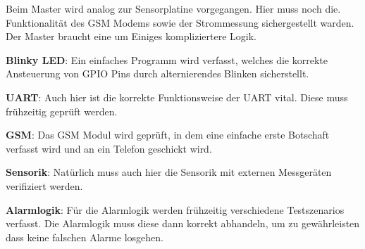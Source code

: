 Beim Master  wird analog  zur Sensorplatine  vorgegangen. Hier muss  noch die.
Funktionalit\"at des GSM Modems  sowie der Strommessung sichergestellt warden.
Der Master braucht eine um Einiges kompliziertere Logik.

\textbf{Blinky  LED}: Ein  einfaches  Programm   wird  verfasst,  welches  die
korrekte Ansteuerung von GPIO Pins durch alternierendes Blinken sicherstellt.

\textbf{UART}: Auch hier ist die korrekte Funktionsweise der UART vital. Diese
muss fr\"uhzeitig gepr\"uft werden.

\textbf{GSM}: Das  GSM  Modul  wird  gepr\"uft, in  dem  eine  einfache  erste
Botschaft verfasst wird und an ein Telefon geschickt wird.

\textbf{Sensorik}: Nat\"urlich  muss  auch  hier  die  Sensorik  mit  externen
Messger\"aten verifiziert werden.

\textbf{Alarmlogik}: F\"ur  die  Alarmlogik werden  fr\"uhzeitig  verschiedene
Testszenarios verfasst. Die  Alarmlogik muss diese dann  korrekt abhandeln, um
zu gew\"ahrleisten dass keine falschen Alarme losgehen.
